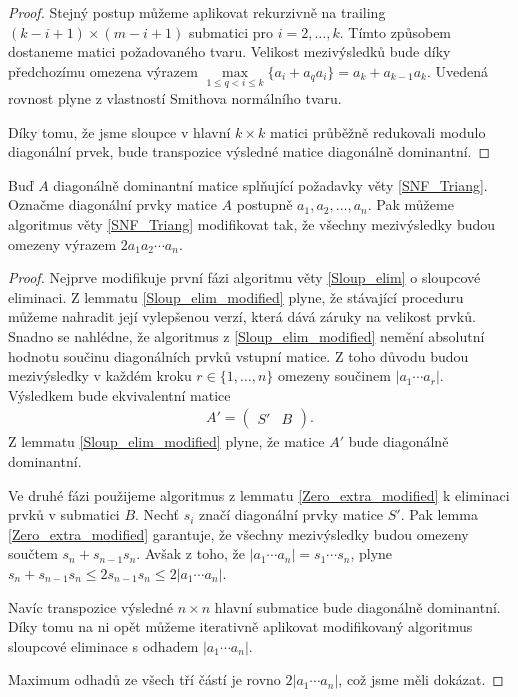\begin{proof}
Stejný postup můžeme aplikovat rekurzivně na trailing
$ (k - i + 1) \times (m - i + 1) $ submatici pro $ i = 2,\dots, k $. Tímto 
způsobem dostaneme matici požadovaného tvaru. Velikost mezivýsledků bude 
díky předchozímu omezena výrazem 
$ \max\limits_{1 \leq q < i \leq k}\{ a_i + a_q a_i \} = a_k + a_{k - 1} a_k $.
Uvedená rovnost plyne z vlastností Smithova normálního tvaru. 

Díky tomu, že jsme sloupce v hlavní $ k \times k $ matici průběžně redukovali
modulo diagonální prvek, bude transpozice výsledné matice diagonálně dominantní.
\end{proof}

\begin{vet}
Buď $ A $ diagonálně dominantní matice splňující požadavky věty \ref{SNF_Triang}.
Označme diagonální prvky matice $ A $ postupně $ a_1, a_2, \dots, a_n $.
Pak můžeme algoritmus věty \ref{SNF_Triang} modifikovat tak, že všechny
mezivýsledky budou omezeny výrazem $ 2 a_1 a_2 \cdots a_n $.
\end{vet}
\begin{proof}
Nejprve modifikuje první fázi algoritmu věty \ref{Sloup_elim} o sloupcové 
eliminaci. Z lemmatu \ref{Sloup_elim_modified} plyne, že stávající proceduru 
můžeme nahradit její vylepšenou verzí, která dává záruky na velikost prvků. 
Snadno se nahlédne, že  algoritmus z \ref{Sloup_elim_modified} nemění absolutní 
hodnotu součinu  diagonálních prvků vstupní matice. Z toho důvodu budou 
mezivýsledky v  každém kroku $ r \in \{1, \dots, n \} $ omezeny součinem 
$ |a_1 \cdots a_r| $.
Výsledkem bude ekvivalentní matice
\begin{align*}
A' =
    \left(
    \begin{array}{c|c}
        S' & B
    \end{array}
    \right)
.
\end{align*}
Z lemmatu \ref{Sloup_elim_modified} plyne, že matice $ A' $ bude diagonálně
dominantní.

Ve druhé fázi použijeme algoritmus z lemmatu \ref{Zero_extra_modified}
k eliminaci prvků v submatici $ B $. Nechť $ s_i $ značí diagonální prvky matice 
$ S' $. Pak lemma \ref{Zero_extra_modified} garantuje, že všechny mezivýsledky 
budou omezeny součtem $ s_n + s_{n - 1} s_n $. Avšak z toho, že 
$ |a_1 \cdots a_n| = s_1 \cdots s_n $, plyne 
$ s_n + s_{n - 1} s_n \leq 2 s_{n - 1} s_n \leq 2 |a_1 \cdots a_n| $.

Navíc transpozice výsledné $ n \times n $ hlavní submatice bude diagonálně 
dominantní. Díky tomu na ni opět můžeme iterativně aplikovat modifikovaný 
algoritmus sloupcové eliminace s odhadem $ |a_1 \cdots a_n| $.

Maximum odhadů ze všech tří částí je rovno $ 2 |a_1 \cdots a_n| $, což jsme měli
dokázat.
\end{proof}








